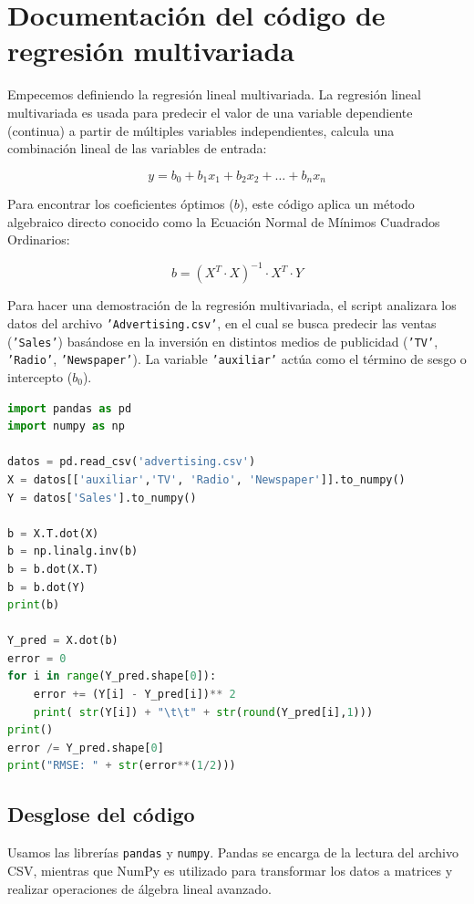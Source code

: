 \documentclass[]{article}
\begin{document}
\section{Documentación del código de regresión multivariada}

Empecemos definiendo la regresión lineal multivariada. La regresión lineal multivariada es usada para predecir el valor de una variable dependiente (continua) a partir de múltiples variables independientes, calcula una combinación lineal de las variables de entrada:

\begin{equation*}
y = b_0 + b_1x_1 + b_2x_2 + \dots + b_nx_n
\end{equation*}

Para encontrar los coeficientes óptimos ($b$), este código aplica un método algebraico directo conocido como la Ecuación Normal de Mínimos Cuadrados Ordinarios:

\begin{equation*}
b = (X^T \cdot X)^{-1} \cdot X^T \cdot Y
\end{equation*}

Para hacer una demostración de la regresión multivariada, el script analizara los datos del archivo \texttt{'Advertising.csv'}, en el cual se busca predecir las ventas (\texttt{'Sales'}) basándose en la inversión en distintos medios de publicidad (\texttt{'TV'}, \texttt{'Radio'}, \texttt{'Newspaper'}). La variable \texttt{'auxiliar'} actúa como el término de sesgo o intercepto ($b_0$).

\begin{lstlisting}[language=Python]
import pandas as pd
import numpy as np

datos = pd.read_csv('advertising.csv')
X = datos[['auxiliar','TV', 'Radio', 'Newspaper']].to_numpy()
Y = datos['Sales'].to_numpy()

b = X.T.dot(X)
b = np.linalg.inv(b)
b = b.dot(X.T)
b = b.dot(Y)
print(b)

Y_pred = X.dot(b)
error = 0
for i in range(Y_pred.shape[0]):
    error += (Y[i] - Y_pred[i])** 2
    print( str(Y[i]) + "\t\t" + str(round(Y_pred[i],1)))
print()
error /= Y_pred.shape[0]
print("RMSE: " + str(error**(1/2)))
\end{lstlisting}

\subsection{Desglose del código}
Usamos las librerías \texttt{pandas} y \texttt{numpy}. Pandas se encarga de la lectura del archivo CSV, mientras que NumPy es utilizado para transformar los datos a matrices y realizar operaciones de álgebra lineal avanzado.
\end{document}
